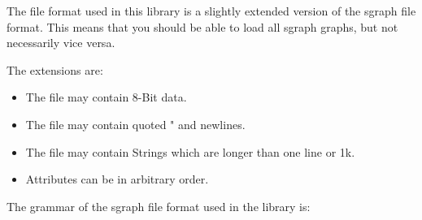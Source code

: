 
The file format used in this library is a slightly extended version of the
sgraph\cite{Sgraph:Himsolt-93a} file format. This means that you should be
able to load all sgraph graphs, but not necessarily vice versa.

The extensions are:

\begin{itemize}

\item
The file may contain 8-Bit data.

\item
The file may contain quoted " and newlines.

\item
The file may contain Strings which are longer than one line or 1k.

\item
Attributes can be in arbitrary order.

\end{itemize}

The grammar of the sgraph file format used in the library is:

